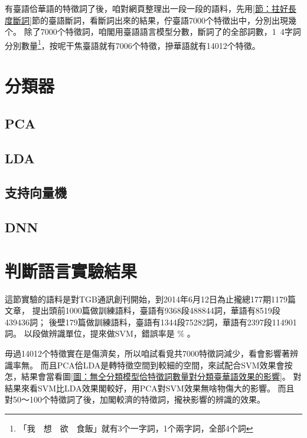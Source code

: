 \documentclass[final,oneside,onecolumn,12pt,a4paper]{book}%
\begin{document}

有臺語佮華語的特徵詞了後，咱對網頁整理出一段一段的語料，先用\ref{節：拄好長度斷詞}節的臺語斷詞，看斷詞出來的結果，佇臺語7000个特徵出中，分別出現幾个。
除了7000个特徵詞，咱閣用臺語語言模型分數，斷詞了的全部詞數，1~4字詞分別數量\footnote{「我　想　欲　食飯」就有3个一字詞，1个兩字詞，全部4个詞}，按呢干焦臺語就有7006个特徵，摻華語就有14012个特徵。

\section{分類器}
\label{節：分類器}

\subsection{PCA}
\label{節：PCA}

\subsection{LDA}
\label{節：LDA}

\subsection{支持向量機}
\label{節：支持向量機}

\subsection{DNN}
\label{節：DNN}


\section{判斷語言實驗結果}
\label{節：判斷語言實驗結果}
這節實驗的語料是對TGB通訊創刊開始，到2014年6月12日為止攏總177期1179篇文章，
提出頭前1000篇做訓練語料，臺語有9368段488844詞，華語有8519段439436詞；
後壁179篇做訓練語料，臺語有1344段75282詞，華語有2397段114901詞。
以段做辨識單位，提來做SVM，錯誤率是 $\%$ 。

毋過14012个特徵實在是傷濟矣，所以咱試看覓共7000特徵詞減少，看會影響著辨識率無。
而且PCA佮LDA是轉特徵空間到較細的空間，來試配合SVM效果會按怎，結果會當看圖\ref{圖：無仝分類模型佮特徵詞數量對分類臺華語效果的影響}。
對結果來看SVM比LDA效果閣較好，用PCA對SVM效果無啥物傷大的影響。
而且對50～100个特徵詞了後，加閣較濟的特徵詞，攏袂影響的辨識的效果。
\end{document}
